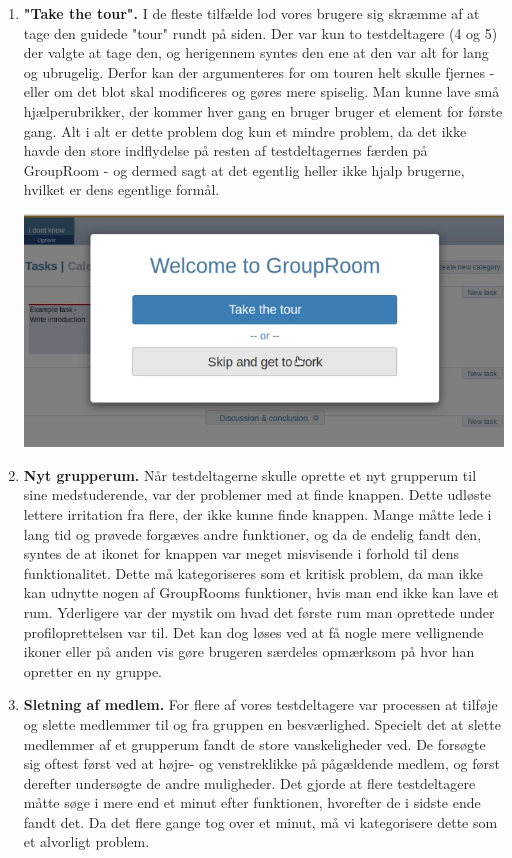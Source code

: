 \documentclass[12pt]{article}
\begin{document}
\begin{enumerate}
  \item \textbf{"Take the tour".} I de fleste tilfælde lod vores brugere sig skræmme af at tage den guidede "tour" rundt på siden. Der var kun to testdeltagere (4 og 5) der valgte at tage den, og herigennem syntes den ene at den var alt for lang og ubrugelig. Derfor kan der argumenteres for om touren helt skulle fjernes - eller om det blot skal modificeres og gøres mere spiselig. Man kunne lave små hjælperubrikker, der kommer hver gang en bruger bruger et element for første gang. Alt i alt er dette problem dog kun et mindre problem, da det ikke havde den store indflydelse på resten af testdeltagernes færden på GroupRoom - og dermed sagt at det egentlig heller ikke hjalp brugerne, hvilket er dens egentlige formål.
  
    \begin{center}\includegraphics[scale=0.4]{Billeder/Take-A-Tour}\end{center}
  
  \item \textbf{Nyt grupperum.} Når testdeltagerne skulle oprette et nyt grupperum til sine medstuderende, var der problemer med at finde knappen. Dette udløste lettere irritation fra flere, der ikke kunne finde knappen. Mange måtte lede i lang tid og prøvede forgæves andre funktioner, og da de endelig fandt den, syntes de at ikonet for knappen var meget misvisende i forhold til dens funktionalitet. Dette må kategoriseres som et kritisk problem, da man ikke kan udnytte nogen af GroupRooms funktioner, hvis man end ikke kan lave et rum. Yderligere var der mystik om hvad det første rum man oprettede under profiloprettelsen var til. Det kan dog løses ved at få nogle mere vellignende ikoner eller på anden vis gøre brugeren særdeles opmærksom på hvor han opretter en ny gruppe.
  
  \item \textbf{Sletning af medlem.} For flere af vores testdeltagere var processen at tilføje og slette medlemmer til og fra gruppen en besværlighed. Specielt det at slette medlemmer af et grupperum fandt de store vanskeligheder ved. De forsøgte sig oftest først ved at højre- og venstreklikke på pågældende medlem, og først derefter undersøgte de andre muligheder. Det gjorde at flere testdeltagere måtte søge i mere end et minut efter funktionen, hvorefter de i sidste ende fandt det. Da det flere gange tog over et minut, må vi kategorisere dette som et alvorligt problem.
  

\end{enumerate}
\end{document}
